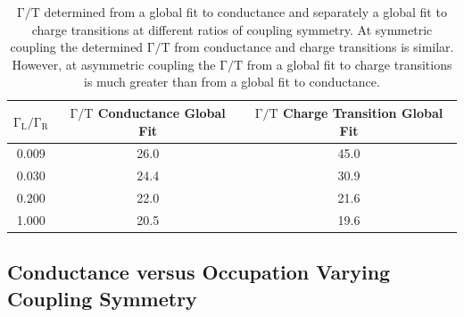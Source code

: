 \begin{table}[H] 
\centering
\begin{tabular}{|c|c|c|}
\hline
 $\mathrm{\Gamma_L}/\mathrm{\Gamma_R}$ & $\mathrm{\Gamma/T}$ Conductance Global Fit & $\mathrm{\Gamma/T}$ Charge Transition Global Fit\\
\hline
0.009 & 26.0 & 45.0\\
0.030 & 24.4 & 30.9\\
0.200 & 22.0 & 21.6 \\
1.000 & 20.5 & 19.6 \\
\hline
\end{tabular}
 \caption[$\mathrm{\Gamma/T}$ determined from a global fit to conductance and charge transitions at different ratios of coupling symmetry.]{\label{tab:sym_coupling_gf} $\mathrm{\Gamma/T}$ determined from a global fit to conductance and separately a global fit to charge transitions at different ratios of coupling symmetry. At symmetric coupling the determined $\mathrm{\Gamma/T}$ from conductance and charge transitions is similar. However, at asymmetric coupling the $\mathrm{\Gamma/T}$ from a global fit to charge transitions is much greater than from a global fit to conductance.}
\end{table}

\afterpage{\clearpage}
\subsection{Conductance versus Occupation Varying Coupling Symmetry}



